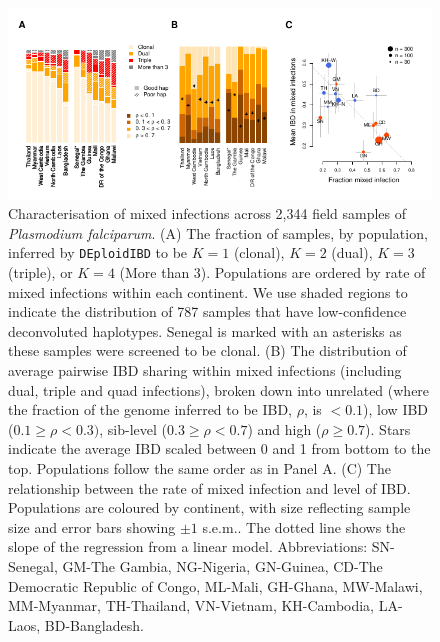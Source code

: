 \documentclass[9pt,lineno]{elife}
\begin{document}
\begin{figure}[htp]
  \begin{center}
    \includegraphics[width=\textwidth]{Fig4.pdf}
    \caption{Characterisation of mixed infections across 2,344 field samples of {\it Plasmodium falciparum}. (A) The fraction of samples, by population, inferred by \texttt{DEploidIBD} to be $K=1$ (clonal), $K=2$ (dual), $K=3$ (triple), or $K=4$ (More than 3).  Populations are ordered by rate of mixed infections within each continent. We use shaded regions to indicate the distribution of 787 samples that have low-confidence deconvoluted haplotypes. Senegal is marked with an asterisks as these samples were screened to be clonal.  (B) The distribution of average pairwise IBD sharing within mixed infections (including dual, triple and quad infections), broken down into unrelated (where the fraction of the genome inferred to be IBD, $\rho$, is $< 0.1$), low IBD ($0.1 \geq \rho < 0.3)$, sib-level ($0.3 \geq \rho <0.7$) and high ($\rho \geq 0.7$). Stars indicate the average IBD scaled between 0 and 1 from bottom to the top.  Populations follow the same order as in Panel A.  (C) The relationship between the rate of mixed infection and level of IBD. Populations are coloured by continent, with size reflecting sample size and error bars showing $\pm 1$ s.e.m..  The dotted line shows the slope of the regression from a linear model.  Abbreviations: SN-Senegal, GM-The Gambia, NG-Nigeria, GN-Guinea, CD-The Democratic Republic of Congo, ML-Mali, GH-Ghana, MW-Malawi, MM-Myanmar, TH-Thailand, VN-Vietnam, KH-Cambodia, LA-Laos, BD-Bangladesh.} \label{fig:mixInfPlot}
  \end{center}
\end{figure}
\end{document}
